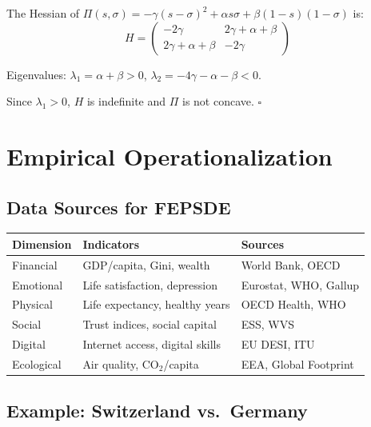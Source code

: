 \documentclass[12pt,a4paper]{article}
\begin{document}
The Hessian of $\Pi(s,\sigma) = -\gamma(s-\sigma)^2 + \alpha s\sigma + \beta(1-s)(1-\sigma)$ is:
\begin{equation}
  H = \begin{pmatrix}
    -2\gamma & 2\gamma + \alpha + \beta \\
    2\gamma + \alpha + \beta & -2\gamma
  \end{pmatrix}
\end{equation}

Eigenvalues: $\lambda_1 = \alpha + \beta > 0$, $\lambda_2 = -4\gamma - \alpha - \beta < 0$.

Since $\lambda_1 > 0$, $H$ is indefinite and $\Pi$ is not concave. \hfill $\square$

\section{Empirical Operationalization}
\label{app:empirical}

\subsection{Data Sources for FEPSDE}

\begin{center}
\renewcommand{\arraystretch}{1.2}
\begin{tabular}{lll}
\hline
\textbf{Dimension} & \textbf{Indicators} & \textbf{Sources} \\
\hline
Financial & GDP/capita, Gini, wealth & World Bank, OECD \\
Emotional & Life satisfaction, depression & Eurostat, WHO, Gallup \\
Physical & Life expectancy, healthy years & OECD Health, WHO \\
Social & Trust indices, social capital & ESS, WVS \\
Digital & Internet access, digital skills & EU DESI, ITU \\
Ecological & Air quality, CO$_2$/capita & EEA, Global Footprint \\
\hline
\end{tabular}
\end{center}

\subsection{Example: Switzerland vs.\ Germany}
\end{document}
